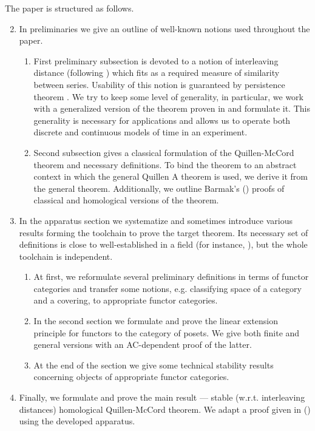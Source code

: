 \documentclass[english,12pt]{article}
\numberwithin{equation}{section}
\theoremstyle{definition}
\theoremstyle{remark}
\begin{document}
The paper is structured as follows.
\begin{enumerate}
  \setcounter{enumi}{1}
  \item In preliminaries we give an outline of well-known notions used throughout the paper.
  \begin{enumerate}[label*=\arabic*.]
    \item First preliminary subsection is devoted to a notion of interleaving distance (following {\cite{GS16}}) which fits as a required measure of similarity between series. Usability of this notion is guaranteed by persistence theorem {\cite{Zomorodian05}}. We try to keep some level of generality, in particular, we work with a generalized version of the theorem proven in {\cite{Corbet18}} and formulate it. This generality is necessary for applications and allows us to operate both discrete and continuous models of time in an experiment.
    \item Second subsection gives a classical formulation of the Quillen-McCord theorem and necessary definitions. To bind the theorem to an abstract context in which the general Quillen A theorem {\cite{Quillen72}} is used, we derive it from the general theorem. Additionally, we outline Barmak's ({\cite{Bar11}}) proofs of classical and homological versions of the theorem.
  \end{enumerate}
  \item In the apparatus section we systematize and sometimes introduce various results forming the toolchain to prove the target theorem. Its necessary set of definitions is close to well-established in a field (for instance, {\cite{Bubenik15}}), but the whole toolchain is independent.
  \begin{enumerate}[label*=\arabic*.]
    \item At first, we reformulate several preliminary definitions in terms of functor categories and transfer some notions, e.g. classifying space of a category and a covering, to appropriate functor categories.
    \item In the second section we formulate and prove the linear extension principle for functors to the category of posets. We give both finite and general versions with an AC-dependent proof of the latter.
    \item At the end of the section we give some technical stability results concerning objects of appropriate functor categories.
  \end{enumerate}
  \item Finally, we formulate and prove the main result --- stable (w.r.t. interleaving distances) homological Quillen-McCord theorem. We adapt a proof given in ({\cite{Bar11}}) using the developed apparatus.
\end{enumerate}
\end{document}
